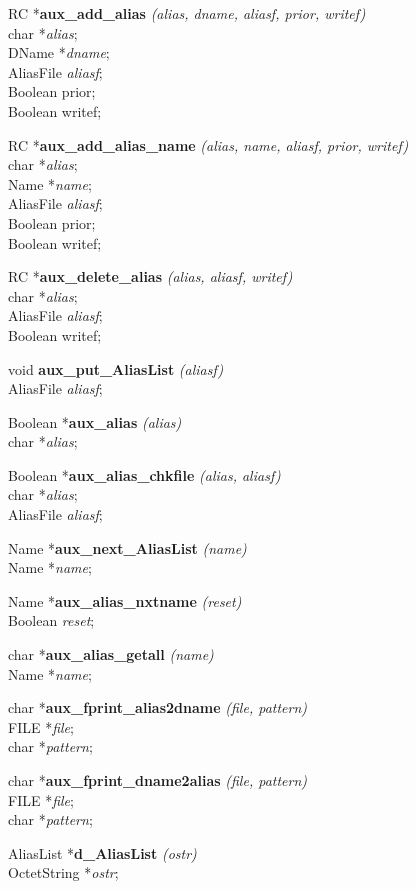 RC *{\bf aux\_add\_alias} {\em (alias, dname, aliasf, prior, writef)} \\
char *{\em alias}; \\ 
DName *{\em dname}; \\
AliasFile {\em aliasf}; \\
Boolean prior; \\
Boolean writef;

RC *{\bf aux\_add\_alias\_name} {\em (alias, name, aliasf, prior, writef)} \\
char *{\em alias}; \\ 
Name *{\em name}; \\
AliasFile {\em aliasf}; \\
Boolean prior; \\
Boolean writef;

RC *{\bf aux\_delete\_alias} {\em (alias, aliasf, writef)} \\
char *{\em alias}; \\
AliasFile {\em aliasf}; \\
Boolean writef;

void {\bf aux\_put\_AliasList} {\em (aliasf)} \\
AliasFile {\em aliasf}; 

Boolean *{\bf aux\_alias} {\em (alias)} \\
char *{\em alias}; 

Boolean *{\bf aux\_alias\_chkfile} {\em (alias, aliasf)} \\
char *{\em alias}; \\
AliasFile {\em aliasf};

Name *{\bf aux\_next\_AliasList} {\em (name)} \\
Name *{\em name};

Name *{\bf aux\_alias\_nxtname} {\em (reset)} \\
Boolean {\em reset};

char *{\bf aux\_alias\_getall} {\em (name)} \\
Name *{\em name};

char *{\bf aux\_fprint\_alias2dname} {\em (file, pattern)} \\
FILE *{\em file}; \\
char *{\em pattern}; 

char *{\bf aux\_fprint\_dname2alias} {\em (file, pattern)} \\
FILE *{\em file}; \\
char *{\em pattern};

AliasList *{\bf d\_AliasList} {\em (ostr)} \\
OctetString *{\em ostr};

